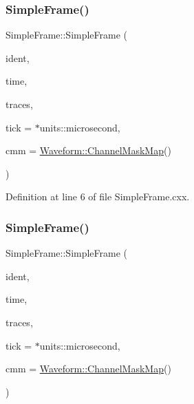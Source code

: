 \subsubsection{\texorpdfstring{Simple\+Frame()}{SimpleFrame()}\hspace{0.1cm}{\footnotesize\ttfamily [1/2]}}
{\footnotesize\ttfamily Simple\+Frame\+::\+Simple\+Frame (\begin{DoxyParamCaption}\item[{int}]{ident,  }\item[{double}]{time,  }\item[{const \hyperlink{class_wire_cell_1_1_i_data_ae1a9f863380499bb43f39fabb6276660}{I\+Trace\+::vector} \&}]{traces,  }\item[{double}]{tick = {$\ast$units\+:\+:microsecond},  }\item[{const \hyperlink{namespace_wire_cell_1_1_waveform_a18b9ae61c858e340252ba3ac83ac3bc0}{Waveform\+::\+Channel\+Mask\+Map} \&}]{cmm = {\ttfamily \hyperlink{namespace_wire_cell_1_1_waveform_a18b9ae61c858e340252ba3ac83ac3bc0}{Waveform\+::\+Channel\+Mask\+Map}()} }\end{DoxyParamCaption})}



Definition at line 6 of file Simple\+Frame.\+cxx.

\mbox{\label{class_wire_cell_1_1_simple_frame_ac4d4421a7c4f8a129bb2712345073d51}} 
\subsubsection{\texorpdfstring{Simple\+Frame()}{SimpleFrame()}\hspace{0.1cm}{\footnotesize\ttfamily [2/2]}}
{\footnotesize\ttfamily Simple\+Frame\+::\+Simple\+Frame (\begin{DoxyParamCaption}\item[{int}]{ident,  }\item[{double}]{time,  }\item[{\hyperlink{class_wire_cell_1_1_i_data_a6edac35e7dd886018740993b28c7ca1e}{I\+Trace\+::shared\+\_\+vector}}]{traces,  }\item[{double}]{tick = {$\ast$units\+:\+:microsecond},  }\item[{const \hyperlink{namespace_wire_cell_1_1_waveform_a18b9ae61c858e340252ba3ac83ac3bc0}{Waveform\+::\+Channel\+Mask\+Map} \&}]{cmm = {\ttfamily \hyperlink{namespace_wire_cell_1_1_waveform_a18b9ae61c858e340252ba3ac83ac3bc0}{Waveform\+::\+Channel\+Mask\+Map}()} }\end{DoxyParamCaption})}




